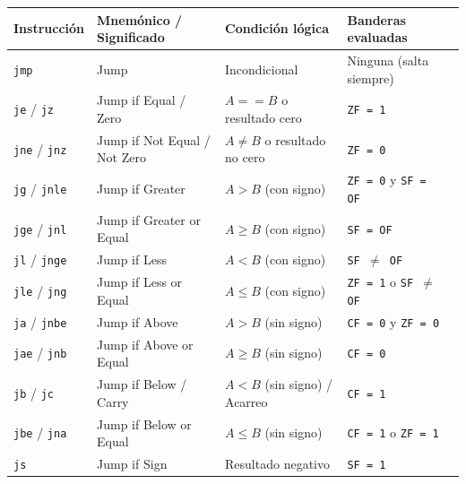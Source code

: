 \begin{table}[htpb]
	\centering
	\renewcommand{\arraystretch}{1.2}
	\begin{tabular}{|l|l|l|l|l|}
		\hline
		\textbf{Instrucción}        & \textbf{Mnemónico / Significado} & \textbf{Condición lógica}      & \textbf{Banderas evaluadas}             \\ \hline
		\texttt{jmp}                & Jump                             & Incondicional                  & Ninguna (salta siempre)                 \\ \hline
		\texttt{je} / \texttt{jz}   & Jump if Equal / Zero             & $A == B$ o resultado cero      & \texttt{ZF = 1}                         \\ \hline
		\texttt{jne} / \texttt{jnz} & Jump if Not Equal / Not Zero     & $A \neq B$ o resultado no cero & \texttt{ZF = 0}                         \\ \hline
		\texttt{jg} / \texttt{jnle} & Jump if Greater                  & $A > B$ (con signo)            & \texttt{ZF = 0} y \texttt{SF = OF}      \\ \hline
		\texttt{jge} / \texttt{jnl} & Jump if Greater or Equal         & $A \ge B$ (con signo)          & \texttt{SF = OF}                        \\ \hline
		\texttt{jl} / \texttt{jnge} & Jump if Less                     & $A < B$ (con signo)            & \texttt{SF $\neq$ OF}                   \\ \hline
		\texttt{jle} / \texttt{jng} & Jump if Less or Equal            & $A \le B$ (con signo)          & \texttt{ZF = 1} o \texttt{SF $\neq$ OF} \\ \hline
		\texttt{ja} / \texttt{jnbe} & Jump if Above                    & $A > B$ (sin signo)            & \texttt{CF = 0} y \texttt{ZF = 0}       \\ \hline
		\texttt{jae} / \texttt{jnb} & Jump if Above or Equal           & $A \ge B$ (sin signo)          & \texttt{CF = 0}                         \\ \hline
		\texttt{jb} / \texttt{jc}   & Jump if Below / Carry            & $A < B$ (sin signo) / Acarreo  & \texttt{CF = 1}                         \\ \hline
		\texttt{jbe} / \texttt{jna} & Jump if Below or Equal           & $A \le B$ (sin signo)          & \texttt{CF = 1} o \texttt{ZF = 1}       \\ \hline
		\texttt{js}                 & Jump if Sign                     & Resultado negativo             & \texttt{SF = 1}                         \\ \hline

\end{tabular}
\end{table}
